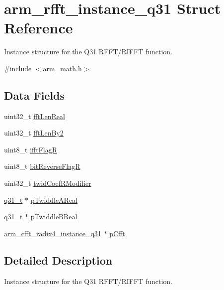 \hypertarget{structarm__rfft__instance__q31}{}\section{arm\+\_\+rfft\+\_\+instance\+\_\+q31 Struct Reference}
\label{structarm__rfft__instance__q31}


Instance structure for the Q31 R\+F\+F\+T/\+R\+I\+F\+FT function.  




{\ttfamily \#include $<$arm\+\_\+math.\+h$>$}

\subsection*{Data Fields}
\begin{DoxyCompactItemize}
\item 
uint32\+\_\+t \mbox{\hyperlink{structarm__rfft__instance__q31_adf0d4604cf5546075d9d4cf122d6c986}{fft\+Len\+Real}}
\item 
uint32\+\_\+t \mbox{\hyperlink{structarm__rfft__instance__q31_ae7db13e0e2999656d98c4223de5b1284}{fft\+Len\+By2}}
\item 
uint8\+\_\+t \mbox{\hyperlink{structarm__rfft__instance__q31_a787d72055c89e4d62b188d6bd646341c}{ifft\+FlagR}}
\item 
uint8\+\_\+t \mbox{\hyperlink{structarm__rfft__instance__q31_ad56ec2425e2422108b8767b43d944591}{bit\+Reverse\+FlagR}}
\item 
uint32\+\_\+t \mbox{\hyperlink{structarm__rfft__instance__q31_a5b06f7f76c018db993fe6acc5708c589}{twid\+Coef\+R\+Modifier}}
\item 
\mbox{\hyperlink{arm__math_8h_adc89a3547f5324b7b3b95adec3806bc0}{q31\+\_\+t}} $\ast$ \mbox{\hyperlink{structarm__rfft__instance__q31_a059faa282f9186687d843ead4a7a0d7e}{p\+Twiddle\+A\+Real}}
\item 
\mbox{\hyperlink{arm__math_8h_adc89a3547f5324b7b3b95adec3806bc0}{q31\+\_\+t}} $\ast$ \mbox{\hyperlink{structarm__rfft__instance__q31_a611c385424ce77519f599980f96d5846}{p\+Twiddle\+B\+Real}}
\item 
\mbox{\hyperlink{structarm__cfft__radix4__instance__q31}{arm\+\_\+cfft\+\_\+radix4\+\_\+instance\+\_\+q31}} $\ast$ \mbox{\hyperlink{structarm__rfft__instance__q31_a0b1f4a05c1824bab3b9bd837a260232a}{p\+Cfft}}
\end{DoxyCompactItemize}


\subsection{Detailed Description}
Instance structure for the Q31 R\+F\+F\+T/\+R\+I\+F\+FT function. 

